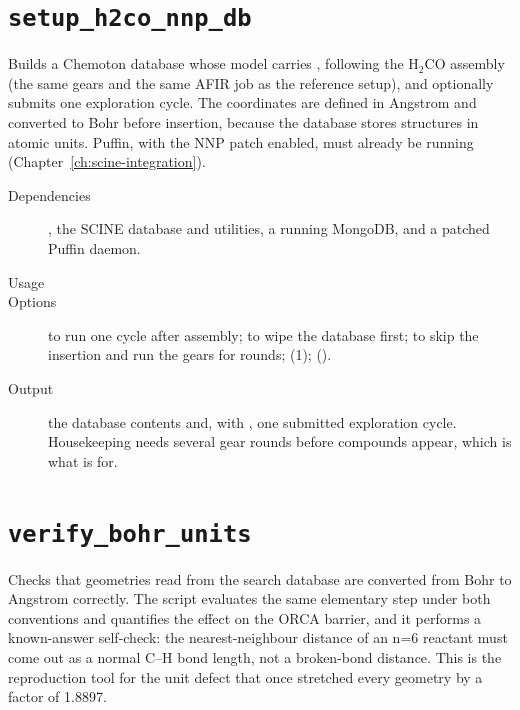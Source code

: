 \section{\texttt{setup\_h2co\_nnp\_db}}

Builds a Chemoton database whose model carries ,
following the H$_2$CO assembly (the same gears and the same AFIR job as the
reference setup), and optionally submits one exploration cycle.  The
coordinates are defined in Angstrom and converted to Bohr before insertion,
because the database stores structures in atomic units.  Puffin, with the NNP
patch enabled, must already be running (Chapter~\ref{ch:scine-integration}).

\begin{description}
  \item[Dependencies] , the SCINE database and utilities, a
        running MongoDB, and a patched Puffin daemon.
  \item[Usage] 
  \item[Options]  to run one cycle after assembly; 
        to wipe the database first;  to skip the insertion
        and run the gears for  rounds;  (1);
         ().
  \item[Output] the database contents and, with , one submitted
        exploration cycle.  Housekeeping needs several gear rounds before
        compounds appear, which is what  is for.
\end{description}

\section{\texttt{verify\_bohr\_units}}

Checks that geometries read from the search database are converted from Bohr
to Angstrom correctly.  The script evaluates the same elementary step under
both conventions and quantifies the effect on the ORCA barrier, and it
performs a known-answer self-check: the nearest-neighbour distance of an
n=6 reactant must come out as a normal C--H bond length, not a broken-bond
distance.  This is the reproduction tool for the unit defect that once
stretched every geometry by a factor of 1.8897.

